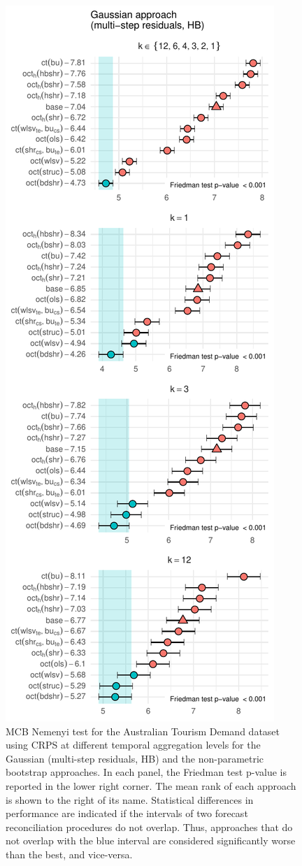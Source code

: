 \documentclass[a4paper,11pt]{article}
\theoremstyle{definition}
\begin{document}
\begin{figure}[p]
	\includegraphics[width = 0.45\linewidth]{fig/VN525/hbsamh_part.pdf}
	\caption{MCB Nemenyi test for the Australian Tourism Demand dataset using CRPS at different temporal aggregation levels for the Gaussian (multi-step residuals, HB) and the non-parametric bootstrap approaches. In each panel, the Friedman test p-value is reported in the lower right corner. The mean rank of each approach is shown to the right of its name. Statistical differences in performance are indicated if the intervals of two forecast reconciliation procedures do not overlap. Thus, approaches that do not overlap with the blue interval are considered significantly worse than the best, and vice-versa.}
	\label{fig:vnmcb}
\end{figure}
\end{document}
